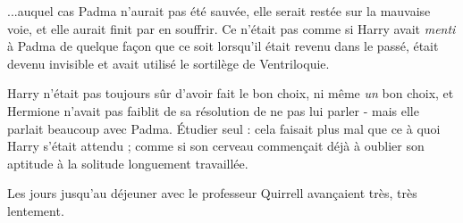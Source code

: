 ...auquel cas Padma n'aurait pas été sauvée, elle serait restée sur la mauvaise voie, et elle aurait finit par en souffrir. Ce n'était pas comme si Harry avait \emph{menti } à Padma de quelque façon que ce soit lorsqu'il était revenu dans le passé, était devenu invisible et avait utilisé le sortilège de Ventriloquie.

Harry n'était pas toujours sûr d'avoir fait le bon choix, ni même \emph{un}  bon choix, et Hermione n'avait pas faiblit de sa résolution de ne pas lui parler - mais elle parlait beaucoup avec Padma. Étudier seul : cela faisait plus mal que ce à quoi Harry s'était attendu ; comme si son cerveau commençait déjà à oublier son aptitude à la solitude longuement travaillée.

Les jours jusqu'au déjeuner avec le professeur Quirrell avançaient très, très lentement.

